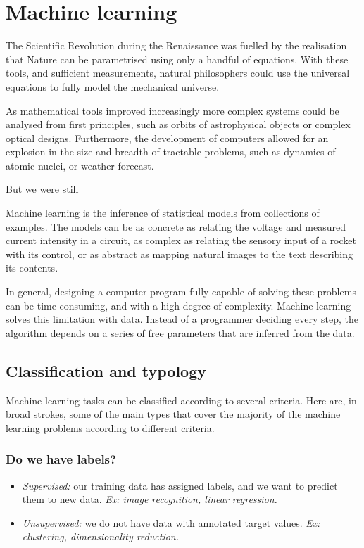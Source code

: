 \chapter{Machine learning}

The Scientific Revolution during the Renaissance was fuelled by the realisation that Nature can be parametrised using only a handful of equations.
With these tools, and sufficient measurements, natural philosophers could use the universal equations to fully model the mechanical universe.

As mathematical tools improved increasingly more complex systems could be analysed from first principles, such as orbits of astrophysical objects or complex optical designs.
Furthermore, the development of computers allowed for an explosion in the size and breadth of tractable problems, such as dynamics of atomic nuclei, or weather forecast.

But we were still 



Machine learning is the inference of statistical models from collections of examples.
The models can be as concrete as relating the voltage and measured current intensity in a circuit, as complex as relating the sensory input of a rocket with its control, or as abstract as mapping natural images to the text describing its contents.

In general, designing a computer program fully capable of solving these problems can be time consuming, and with a high degree of complexity.
Machine learning solves this limitation with data.
Instead of a programmer deciding every step, the algorithm depends on a series of free parameters that are inferred from the data.

\section{Classification and typology}
Machine learning tasks can be classified according to several criteria.
Here are, in broad strokes, some of the main types that cover the majority of the machine learning problems according to different criteria.

\subsection{Do we have labels?}
\begin{itemize}
\item \emph{Supervised:} our training data has assigned labels, and we want to predict them to new data. \emph{Ex: image recognition, linear regression.}
\item \emph{Unsupervised:} we do not have data with annotated target values. \emph{Ex: clustering, dimensionality reduction.}
\end{itemize}


